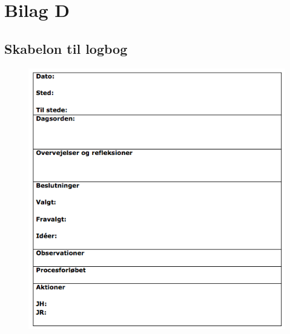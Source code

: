 \newpage

\section{Bilag D}
\subsection{Skabelon til logbog}
\label{App:logbog}
\begin{figure}[htb]
\centering
\includegraphics[width=6in]{Logbogskabelon}
\end{figure}

\newpage
